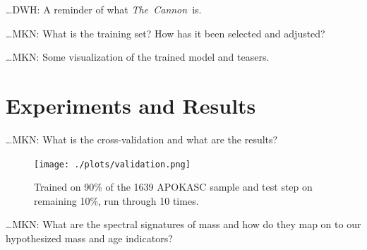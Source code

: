 \documentclass[12pt, preprint]{aastex}
\newcommand{\project}[1]{\textsl{#1}}
\newcommand{\thecannon}{\project{The~Cannon}}
\begin{document}
\ldots DWH: A reminder of what \thecannon\ is.

\ldots MKN: What is the training set?  How has it been selected and
adjusted?

\ldots MKN: Some visualization of the trained model and teasers.

\section{Experiments and Results}

\ldots MKN: What is the cross-validation and what are the results?
\begin{figure}[h!]
\centering
  \texttt{[image: ./plots/validation.png]}
  \caption{Trained on 90\% of the 1639 APOKASC sample and test step on remaining 10\%, run through 10 times.}
\label{fig:validation}
\end{figure}

\ldots MKN: What are the spectral signatures of mass and how do they
map on to our hypothesized mass and age indicators?
\end{document}
